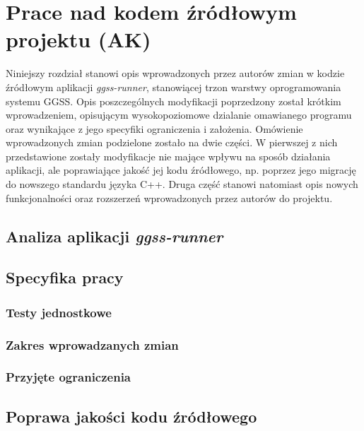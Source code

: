 \chapter{Prace nad kodem źródłowym projektu (AK)}
\label{cha:code}

Niniejszy rozdział stanowi opis wprowadzonych przez autorów zmian w kodzie źródłowym aplikacji \emph{ggss-runner}, stanowiącej trzon warstwy oprogramowania systemu GGSS. Opis poszczególnych modyfikacji poprzedzony został krótkim wprowadzeniem, opisującym wysokopoziomowe dzialanie omawianego programu oraz wynikające z jego specyfiki ograniczenia i założenia. Omówienie wprowadzonych zmian podzielone zostało na dwie części. W pierwszej z nich przedstawione zostały modyfikacje nie mające wpływu na sposób działania aplikacji, ale poprawiające jakość jej kodu źródłowego, np. poprzez jego migrację do nowszego standardu języka C++. Druga część stanowi natomiast opis nowych funkcjonalności oraz rozszerzeń wprowadzonych przez autorów do projektu. 

\section{Analiza aplikacji \emph{ggss-runner}}

\section{Specyfika pracy}

\subsection{Testy jednostkowe} %
\subsection{Zakres wprowadzanych zmian} %
\subsection{Przyjęte ograniczenia} %

\section{Poprawa jakości kodu źródłowego}


